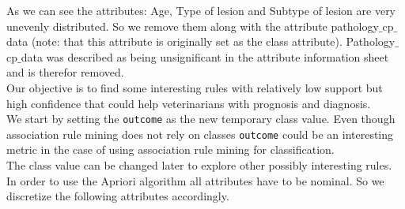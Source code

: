 As we can see the attributes: Age, Type of lesion and Subtype of lesion are very unevenly distributed. So we remove them along with the attribute pathology$\_$cp$\_$data (note: that this attribute is originally set as the class attribute). Pathology$\_$cp$\_$data was described as being unsignificant in the attribute information sheet and is therefor removed.\\
Our objective is to find some interesting rules with relatively low support but high confidence that could help veterinarians with prognosis and diagnosis.\\
We start by setting the \verb|outcome| as the new temporary class value. Even though association rule mining does not rely on classes  \verb|outcome| could be an interesting metric in the case of using association rule mining for classification.\\
The class value can be changed later to explore other possibly interesting rules.\\
In order to use the Apriori algorithm all attributes have to be nominal. So we discretize the following attributes accordingly.
